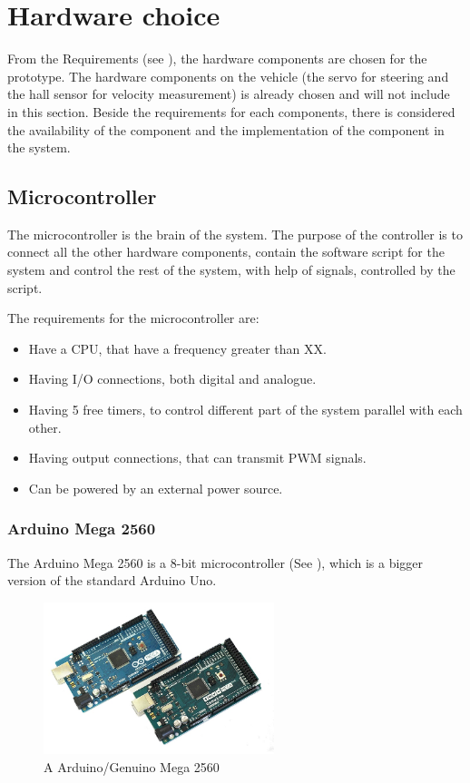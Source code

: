 \section{Hardware choice} \label{Hardwarechoice}
From the Requirements (see ), the hardware components are chosen for the prototype. The hardware components on the vehicle (the servo for steering and the hall sensor for velocity measurement) is already chosen and will not include in this section. Beside the requirements for each components, there is considered the availability of the component and the implementation of the component in the system. 


\subsection{Microcontroller}
The microcontroller is the brain of the system. The purpose of the controller is to connect all the other hardware components, contain the software script for the system and control the rest of the system, with help of signals, controlled by the script.

The requirements for the microcontroller are:
\begin{itemize}
\item Have a CPU, that have a frequency greater than XX. 
\item Having I/O connections, both digital and analogue.
\item Having 5 free timers, to control different part of the system parallel with each other.
\item Having output connections, that can transmit PWM signals.
\item Can be powered by an external power source.
\end{itemize} 

\subsubsection{Arduino Mega 2560}
The Arduino Mega 2560 is a 8-bit microcontroller (See ), which is a bigger version of the standard Arduino Uno. 

\begin{figure}[H]
	\centering
	\includegraphics[width=0.60\textwidth]{figures/ArdGenMega}
		\caption{A Arduino/Genuino Mega 2560} 
	\label{ArdGenMega}
\end{figure}

